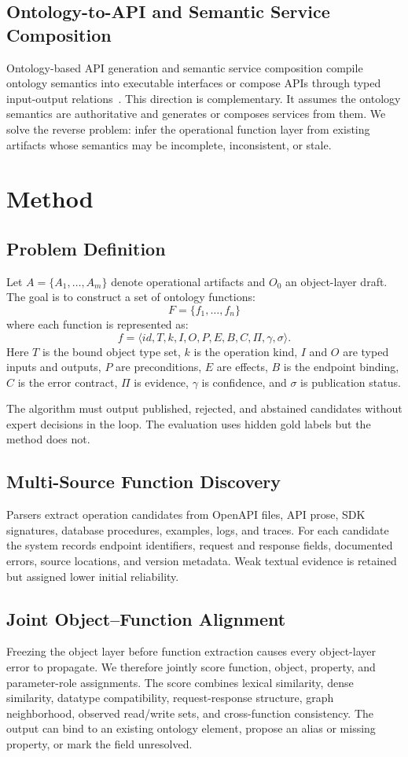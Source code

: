 \documentclass[10pt,twocolumn]{article}
\begin{document}
\subsection{Ontology-to-API and Semantic Service Composition}
Ontology-based API generation and semantic service composition compile ontology semantics into executable interfaces or compose APIs through typed input-output relations~\cite{garijo2020oba,callaghan2023biothings}. This direction is complementary. It assumes the ontology semantics are authoritative and generates or composes services from them. We solve the reverse problem: infer the operational function layer from existing artifacts whose semantics may be incomplete, inconsistent, or stale.

\section{Method}
\subsection{Problem Definition}
Let $A=\{A_1,\ldots,A_m\}$ denote operational artifacts and $O_0$ an object-layer draft. The goal is to construct a set of ontology functions:
\[
F = \{f_1,\ldots,f_n\}
\]
where each function is represented as:
\[
f=\langle id,T,k,I,O,P,E,B,C,\Pi,\gamma,\sigma\rangle.
\]
Here $T$ is the bound object type set, $k$ is the operation kind, $I$ and $O$ are typed inputs and outputs, $P$ are preconditions, $E$ are effects, $B$ is the endpoint binding, $C$ is the error contract, $\Pi$ is evidence, $\gamma$ is confidence, and $\sigma$ is publication status.

The algorithm must output published, rejected, and abstained candidates without expert decisions in the loop. The evaluation uses hidden gold labels but the method does not.

\subsection{Multi-Source Function Discovery}
Parsers extract operation candidates from OpenAPI files, API prose, SDK signatures, database procedures, examples, logs, and traces. For each candidate the system records endpoint identifiers, request and response fields, documented errors, source locations, and version metadata. Weak textual evidence is retained but assigned lower initial reliability.

\subsection{Joint Object--Function Alignment}
Freezing the object layer before function extraction causes every object-layer error to propagate. We therefore jointly score function, object, property, and parameter-role assignments. The score combines lexical similarity, dense similarity, datatype compatibility, request-response structure, graph neighborhood, observed read/write sets, and cross-function consistency. The output can bind to an existing ontology element, propose an alias or missing property, or mark the field unresolved.
\end{document}
